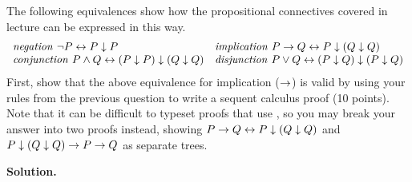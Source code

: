 \documentclass[10pt]{article}
\begin{document}
\begin{enumerate}
The following equivalences show how the propositional connectives covered in lecture can be expressed in this way.
\[
\begin{array}{ll}
\mathit{negation}\ \lnot P \leftrightarrow P\downarrow P &
\mathit{implication}\ P\rightarrow Q \leftrightarrow P\downarrow(Q\downarrow Q)
\\
\mathit{conjunction}\ P\land Q \leftrightarrow (P\downarrow P)\downarrow(Q\downarrow Q)
&
\mathit{disjunction}\ P\lor Q \leftrightarrow (P\downarrow Q)\downarrow(P\downarrow Q)
\end{array}
\]
First, show that the above equivalence for implication ($\rightarrow$) is valid by using your rules from the previous question to write a sequent calculus proof (10 points).
Note that it can be difficult to typeset proofs that use , so you may break your answer into two proofs instead, showing $P\rightarrow Q \leftrightarrow P\downarrow(Q\downarrow Q)$ and $P\downarrow(Q\downarrow Q) \rightarrow P\rightarrow Q$ as separate trees.

\textbf{Solution.}

%

\newpage

\end{enumerate}
\end{document}
